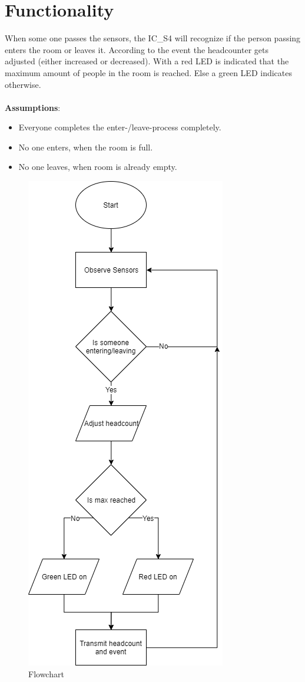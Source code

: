 \documentclass[12pt,a4 paper] {report}
\begin{document}
\section*{Functionality}
When some one passes the sensors, the IC\_S4 will recognize if the person passing enters the room or leaves it. 
According to the event the headcounter gets adjusted (either increased or decreased). With a red LED is indicated that 
the maximum amount of people in the room is reached. Else a green LED indicates otherwise. \\ \\
\textbf{Assumptions}:
\begin{itemize}
	\item Everyone completes the enter-/leave-process completely.
	\item No one enters, when the room is full.
	\item No one leaves, when room is already empty.
\end{itemize}
\begin{figure}[h]
	\centering	
	\includegraphics[scale=0.5]{../png/flowchart.png}
	\caption{Flowchart}
\end{figure}
\end{document}
